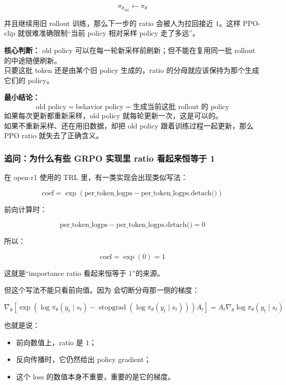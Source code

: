 \[
\pi_{\theta_\text{old}} \leftarrow \pi_\theta
\]

并且继续用旧 rollout 训练，那么下一步的 ratio 会被人为拉回接近 $1$。这样 PPO-clip 就很难准确限制“当前 policy 相对采样 policy 走了多远”。

\begin{warnbox}
\textbf{核心判断：} old policy 可以在每一轮新采样前刷新；但不能在复用同一批 rollout 的中途随便刷新。\\
只要这批 token 还是由某个旧 policy 生成的，ratio 的分母就应该保持为那个生成它们的 policy。
\end{warnbox}

\begin{summarybox}
\textbf{最小结论：}
\[
\text{old policy} = \text{behavior policy} = \text{生成当前这批 rollout 的 policy}
\]
如果每次更新都重新采样，old policy 就每轮更新一次，这是可以的。\\
如果不重新采样、还在用旧数据，却把 old policy 跟着训练过程一起更新，那么 PPO ratio 就失去了正确含义。
\end{summarybox}

\subsubsection{追问：为什么有些 GRPO 实现里 ratio 看起来恒等于 1}

在 open-r1 使用的 TRL  里，有一类实现会出现类似写法：

\[
\text{coef}
=
\exp\left(
\text{per\_token\_logps}
-
\text{per\_token\_logps.detach()}
\right)
\]

前向计算时：

\[
\text{per\_token\_logps}
-
\text{per\_token\_logps.detach()}
=
0
\]

所以：

\[
\text{coef} = \exp(0) = 1
\]

这就是“importance ratio 看起来恒等于 1”的来源。

但这个写法不能只看前向值。因为  会切断分母那一侧的梯度：

\[
\nabla_\theta
\left[
\exp\left(
\log \pi_\theta(y_t \mid s_t)
-
\operatorname{stopgrad}(\log \pi_\theta(y_t \mid s_t))
\right)
A_t
\right]
=
A_t \nabla_\theta \log \pi_\theta(y_t \mid s_t)
\]

也就是说：

\begin{itemize}[leftmargin=1.5em]
  \item 前向数值上，ratio 是 $1$；
  \item 反向传播时，它仍然给出 policy gradient；
  \item 这个 loss 的数值本身不重要，重要的是它的梯度。
\end{itemize}

